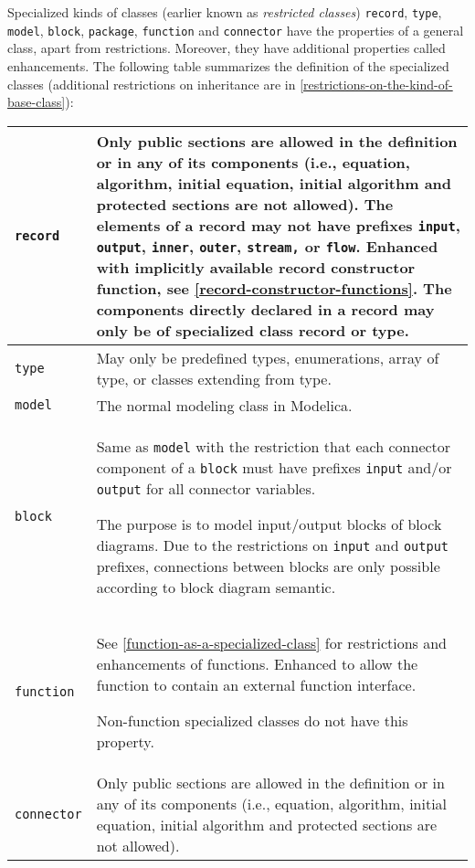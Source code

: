 Specialized kinds of classes (earlier known as \emph{restricted classes})
\lstinline!record!, \lstinline!type!, \lstinline!model!, \lstinline!block!, \lstinline!package!, \lstinline!function! and \lstinline!connector!
have the properties of a general class, apart from restrictions.
Moreover, they have additional properties called enhancements. The
following table summarizes the definition of the specialized classes
(additional restrictions on inheritance are in \cref{restrictions-on-the-kind-of-base-class}):
\begin{longtable}{|p{4cm}|p{9cm}|}
\hline \endhead
\lstinline!record! & Only public sections are allowed in the definition or
in any of its components (i.e., equation, algorithm, initial equation,
initial algorithm and protected sections are not allowed). The elements
of a record may not have prefixes \lstinline!input!, \lstinline!output!,
\lstinline!inner!, \lstinline!outer!, \lstinline!stream,!
or \lstinline!flow!. Enhanced with implicitly available record constructor function,
see \cref{record-constructor-functions}. The components
directly declared in a record may only be of specialized class record
or type.\\ \hline
\lstinline!type! & May only be predefined types, enumerations, array of
type, or classes extending from type.\\ \hline
\lstinline!model! & The normal modeling class in Modelica.\\ \hline
\lstinline!block! & Same as \lstinline!model! with the restriction that each connector
component of a \lstinline!block! must have prefixes \lstinline!input! and/or \lstinline!output! for all
connector variables.
\par
\begin{nonnormative*}
The purpose is to model input/output blocks of block diagrams.  Due to the restrictions on \lstinline!input! and \lstinline!output! prefixes,
connections between blocks are only possible according to block diagram semantic.
\end{nonnormative*}
\\ \hline
\lstinline!function! & See \cref{function-as-a-specialized-class} for restrictions
and enhancements of functions. Enhanced to allow the
function to contain an external function interface.
\par
\begin{nonnormative*}
Non-function specialized classes do not have this property.
\end{nonnormative*}
\\ \hline
\lstinline!connector! & Only public sections are allowed in the definition or in any of its
components (i.e., equation, algorithm, initial equation, initial
algorithm and protected sections are not allowed).


\end{longtable}
